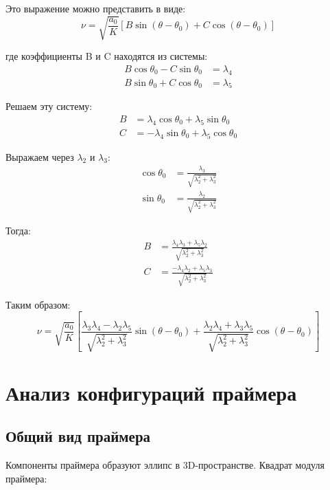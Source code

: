 \documentclass[12pt]{article}
\begin{document}
Это выражение можно представить в виде:
\begin{equation}
\nu = \sqrt{\frac{a_0}{K}} [B \sin(\theta - \theta_0) + C \cos(\theta - \theta_0)]
\end{equation}

где коэффициенты B и C находятся из системы:
\begin{align}
B \cos \theta_0 - C \sin \theta_0 &= \lambda_4 \\
B \sin \theta_0 + C \cos \theta_0 &= \lambda_5
\end{align}

Решаем эту систему:
\begin{align}
B &= \lambda_4 \cos \theta_0 + \lambda_5 \sin \theta_0 \\
C &= -\lambda_4 \sin \theta_0 + \lambda_5 \cos \theta_0
\end{align}

Выражаем через $\lambda_2$ и $\lambda_3$:
\begin{align}
\cos \theta_0 &= \frac{\lambda_3}{\sqrt{\lambda_2^2 + \lambda_3^2}} \\
\sin \theta_0 &= \frac{\lambda_2}{\sqrt{\lambda_2^2 + \lambda_3^2}}
\end{align}

Тогда:
\begin{align}
B &= \frac{\lambda_4 \lambda_3 + \lambda_5 \lambda_2}{\sqrt{\lambda_2^2 + \lambda_3^2}} \\
C &= \frac{-\lambda_4 \lambda_2 + \lambda_5 \lambda_3}{\sqrt{\lambda_2^2 + \lambda_3^2}}
\end{align}

Таким образом:
\begin{equation}
\nu = \sqrt{\frac{a_0}{K}} \left[
\frac{\lambda_3 \lambda_4 - \lambda_2 \lambda_5}{\sqrt{\lambda_2^2 + \lambda_3^2}} \sin(\theta - \theta_0) + 
\frac{\lambda_2 \lambda_4 + \lambda_3 \lambda_5}{\sqrt{\lambda_2^2 + \lambda_3^2}} \cos(\theta - \theta_0)
\right] \tag{13}
\end{equation}

\section{Анализ конфигураций праймера}

\subsection{Общий вид праймера}

Компоненты праймера образуют эллипс в 3D-пространстве. Квадрат модуля праймера:
\end{document}
